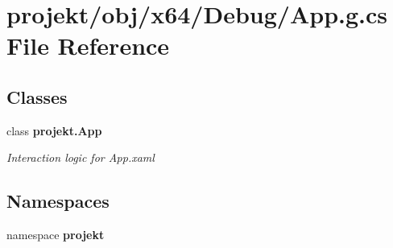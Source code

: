 \section{projekt/obj/x64/\+Debug/\+App.g.\+cs File Reference}
\label{x64_2Debug_2App_8g_8cs}
\subsection*{Classes}
\begin{DoxyCompactItemize}
\item 
class \textbf{ projekt.\+App}
\begin{DoxyCompactList}\small\item\em Interaction logic for App.\+xaml \end{DoxyCompactList}\end{DoxyCompactItemize}
\subsection*{Namespaces}
\begin{DoxyCompactItemize}
\item 
namespace \textbf{ projekt}
\end{DoxyCompactItemize}
